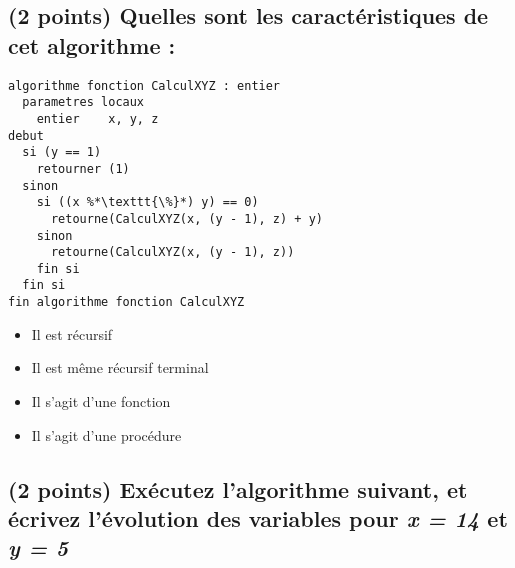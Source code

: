 \documentclass[11pt,a4paper]{article}
\begin{document}


\subsection{(2 points) Quelles sont les caractéristiques de cet algorithme : }

\bigskip

\begin{lstlisting}[style=algorithmique]
algorithme fonction CalculXYZ : entier
  parametres locaux
    entier    x, y, z
debut
  si (y == 1)
    retourner (1)
  sinon
    si ((x %*\texttt{\%}*) y) == 0)
      retourne(CalculXYZ(x, (y - 1), z) + y)
    sinon
      retourne(CalculXYZ(x, (y - 1), z))
    fin si
  fin si
fin algorithme fonction CalculXYZ \end{lstlisting}

\begin{itemize}
  \item[\checkmark] Il est récursif \\ %
  \item[\CaseCoche] Il est même récursif terminal \\ %
  \item[\checkmark] Il s'agit d'une fonction \\ %
  \item[\CaseCoche] Il s'agit d'une procédure \\ %
\end{itemize}


\newpage
\vfillFirst


\subsection{(2 points) Exécutez l'algorithme suivant, et écrivez l'évolution des variables pour \textit{x = 14} et \textit{y = 5} }

\end{document}
